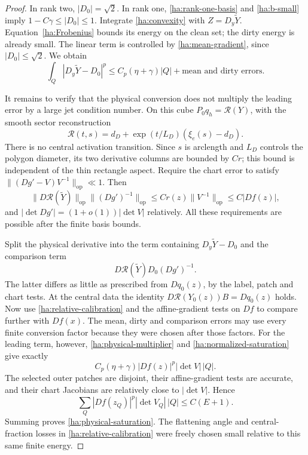 \begin{proof}
In rank two, $|D_0|=\sqrt2$.  In rank one,
\eqref{ha:rank-one-basis} and \eqref{ha:b-small} imply
$1-C\gamma\le|D_0|\le1$.  Integrate
\eqref{ha:convexity} with $Z=D_y\widetilde Y$.
Equation~\eqref{ha:Frobenius} bounds its energy on the clean set;
the dirty energy is already small.  The linear term is controlled
by \eqref{ha:mean-gradient}, since $|D_0|\le\sqrt2$.  We obtain
\begin{equation}\label{ha:normalized-saturation}
 \int_Q|D_y\widetilde Y-D_0|^p
      \le C_p(\eta+\gamma)|Q|
                   +\text{mean and dirty errors}.
\end{equation}

It remains to verify that the physical conversion does not multiply
the leading error by a large jet condition number.  On this cube
$P_0q_h=\mathcal R(Y)$, with the smooth sector reconstruction
\[
       \mathcal R(t,s)=d_D+\exp(t/L_D)(\xi_e(s)-d_D).
\]
There is no central activation transition.  Since $s$ is arclength
and $L_D$ controls the polygon diameter, its two derivative columns
are bounded by $Cr$; this bound is independent of the thin
rectangle aspect.  Require the chart error to satisfy
$\|(Dg'-V)V^{-1}\|_{\mathrm{op}}\ll1$.  Then
\begin{equation}\label{ha:physical-multiplier}
 \|D\mathcal R(\widetilde Y)\|_{\mathrm{op}}
       \|(Dg')^{-1}\|_{\mathrm{op}}
       \le Cr(z)\|V^{-1}\|_{\mathrm{op}}
       \le C|Df(z)|,
\end{equation}
and $|\det Dg'|=(1+o(1))|\det V|$ relatively.  All these
requirements are possible after the finite basis bounds.

Split the physical derivative into the term containing
$D_y\widetilde Y-D_0$ and the comparison term
\[
             D\mathcal R(\widetilde Y)D_0(Dg')^{-1}.
\]
The latter differs as little as prescribed from $Dq_0(z)$, by the
label, patch and chart tests.  At the central data the identity
$D\mathcal R(Y_0(z))B=Dq_0(z)$ holds.  Now use
\eqref{ha:relative-calibration} and the affine-gradient tests on
$Df$ to compare further with $Df(x)$.  The mean, dirty and comparison
errors may use every finite conversion factor because they were
chosen after those factors.  For the leading term, however,
\eqref{ha:physical-multiplier} and
\eqref{ha:normalized-saturation} give exactly
\[
          C_p(\eta+\gamma)
                      |Df(z)|^p|\det V|\,|Q|.
\]
The selected outer patches are disjoint, their affine-gradient
tests are accurate, and their chart Jacobians are relatively close
to $|\det V|$.  Hence
\[
                  \sum_Q|Df(z_Q)|^p|\det V_Q|\,|Q|
                         \le C(E+1).
\]
Summing proves \eqref{ha:physical-saturation}.  The flattening angle
and central-fraction losses in \eqref{ha:relative-calibration} were
freely chosen small relative to this same finite energy.
\end{proof}

